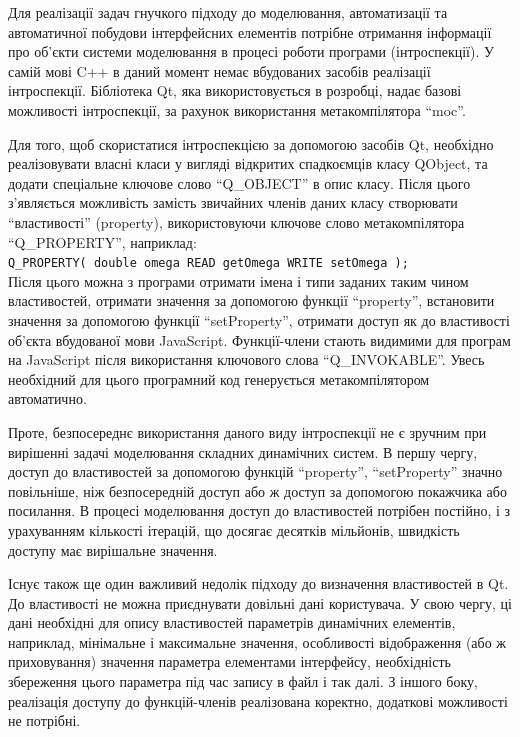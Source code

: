 Для реалізації задач гнучкого підходу до моделювання,
автоматизації та автоматичної побудови інтерфейсних елементів
потрібне отримання інформації про об'єкти системи моделювання
в процесі роботи програми (інтроспекції). У самій мові C++ в
даний момент немає вбудованих засобів реалізації інтроспекції. Бібліотека
Qt, яка використовується в розробці, надає базові можливості
інтроспекції, за рахунок використання метакомпілятора ``moc''.

Для того, щоб скористатися інтроспекцією за допомогою засобів
Qt, необхідно реалізовувати власні класи у вигляді відкритих
спадкоємців класу QObject, та додати спеціальне ключове слово ``Q\_OBJECT''
в опис класу. Після цього з'являється можливість замість
звичайних членів даних класу створювати ``властивості'' (property),
використовуючи ключове слово метакомпілятора ``Q\_PROPERTY'',
наприклад:\\
\verb!Q_PROPERTY( double omega READ getOmega WRITE setOmega );!\\
Після цього можна з програми отримати імена і типи заданих таким
чином властивостей, отримати значення за допомогою функції
``property'', встановити значення за допомогою функції ``setProperty'',
отримати доступ як до властивості об'єкта вбудованої мови
JavaScript. Функції-члени стають видимими для програм на JavaScript після
використання ключового слова ``Q\_INVOKABLE''. Увесь необхідний для
цього програмний код генерується метакомпілятором автоматично.

Проте, безпосереднє використання даного виду інтроспекції не є
зручним при вирішенні задачі моделювання складних динамічних систем. В
першу чергу, доступ до властивостей за допомогою функцій
``property'', ``setProperty'' значно повільніше, ніж безпосередній доступ
або ж доступ за допомогою покажчика або посилання. В процесі
моделювання доступ до властивостей потрібен постійно, і з
урахуванням кількості ітерацій, що досягає десятків мільйонів,
швидкість доступу має вирішальне значення.

Існує також ще один важливий недолік підходу до визначення
властивостей в Qt. До властивості не можна приєднувати довільні
дані користувача. У свою чергу, ці дані необхідні для опису
властивостей параметрів динамічних елементів, наприклад,
мінімальне і максимальне значення, особливості відображення
(або ж приховування) значення параметра елементами інтерфейсу,
необхідність збереження цього параметра під час запису в файл
і так далі. З іншого боку, реалізація доступу до функцій-членів
реалізована коректно, додаткові можливості не потрібні.

